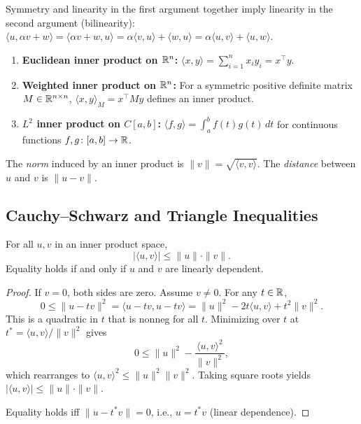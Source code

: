 \documentclass[11pt,a4paper]{article}
\begin{document}
\begin{remark}
\label{rem:bilinearity}
Symmetry and linearity in the first argument together imply linearity in
the second argument (bilinearity):
$\langle u, \alpha v + w \rangle = \langle \alpha v + w, u \rangle
= \alpha \langle v, u \rangle + \langle w, u \rangle
= \alpha \langle u, v \rangle + \langle u, w \rangle$.
\end{remark}

\begin{example}
\label{ex:standard_ips}
\begin{enumerate}[nosep]
  \item \textbf{Euclidean inner product on $\mathbb{R}^n$:}
        $\langle x, y \rangle = \sum_{i=1}^n x_i y_i = x^\top y$.
  \item \textbf{Weighted inner product on $\mathbb{R}^n$:}
        For a symmetric positive definite matrix $M \in \mathbb{R}^{n \times n}$,
        $\langle x, y \rangle_M = x^\top M y$ defines an inner product.
  \item \textbf{$L^2$ inner product on $C[a,b]$:}
        $\langle f, g \rangle = \int_a^b f(t) g(t)\, dt$ for continuous
        functions $f, g\colon [a,b] \to \mathbb{R}$.
\end{enumerate}
\end{example}

\begin{definition}
\label{def:norm}
The \emph{norm} induced by an inner product is
$\|v\| = \sqrt{\langle v, v \rangle}$.  The \emph{distance} between
$u$ and $v$ is $\|u - v\|$.
\end{definition}

\subsection{Cauchy--Schwarz and Triangle Inequalities}

\begin{theorem}
\label{thm:cauchy_schwarz}
For all $u, v$ in an inner product space,
\[
  |\langle u, v \rangle| \leq \|u\| \cdot \|v\|.
\]
Equality holds if and only if $u$ and $v$ are linearly dependent.
\end{theorem}

\begin{proof}
If $v = 0$, both sides are zero.  Assume $v \neq 0$.  For any $t \in \mathbb{R}$,
\[
  0 \leq \|u - tv\|^2
  = \langle u - tv, u - tv \rangle
  = \|u\|^2 - 2t\langle u, v \rangle + t^2 \|v\|^2.
\]
This is a quadratic in $t$ that is nonneg for all $t$.  Minimizing over
$t$ at $t^* = \langle u, v \rangle / \|v\|^2$ gives
\[
  0 \leq \|u\|^2 - \frac{\langle u, v \rangle^2}{\|v\|^2},
\]
which rearranges to $\langle u, v \rangle^2 \leq \|u\|^2 \|v\|^2$.
Taking square roots yields $|\langle u, v \rangle| \leq \|u\| \cdot \|v\|$.

Equality holds iff $\|u - t^* v\| = 0$, i.e., $u = t^* v$ (linear dependence).
\end{proof}
\end{document}
